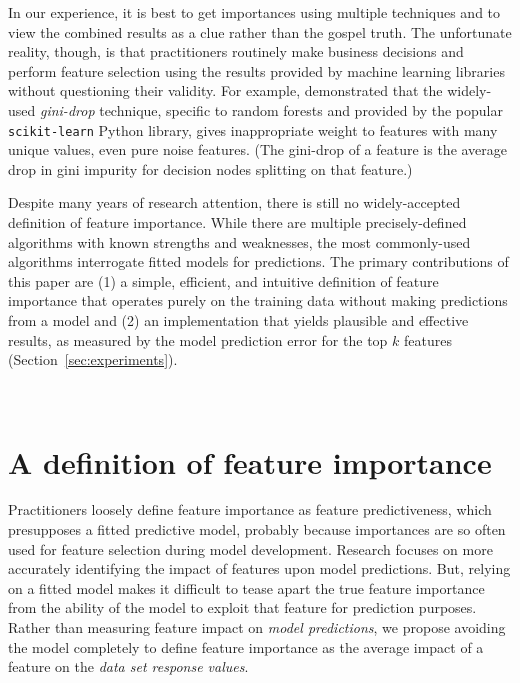 \documentclass[12pt]{article}
\newcommand{\secref}[1]{Section~\ref{#1}}
\newcommand{\todo}[1]{{{\color{red}{[#1]}}}}
\begin{document}
In our experience, it is best to get importances using multiple techniques and to view the combined results as a clue rather than the gospel truth.  The unfortunate reality, though, is that practitioners routinely make business decisions and  perform feature selection using the results provided by machine learning libraries without questioning their validity.  For example, \cite{rfpimp} demonstrated that the widely-used {\em gini-drop} technique, specific to random forests and provided by the popular {\tt scikit-learn} Python library, gives inappropriate weight to features with many unique values, even pure noise features. (The gini-drop of a feature is the average drop in gini impurity for decision nodes splitting on that feature.) \todo{transition}

Despite many years of research attention, there is still no widely-accepted definition of feature importance. While there are multiple precisely-defined algorithms with known strengths and weaknesses,  the most commonly-used algorithms interrogate fitted models for predictions. The primary contributions of this paper are (1) a simple, efficient, and intuitive definition of feature importance that operates purely on the training data without making predictions from a model and (2) an implementation that yields plausible and effective results, as measured by the model prediction error for the top $k$ features (\secref{sec:experiments}). \todo{probably need to say regression versus classifier here.}

~\\
\noindent \todo{Likely a good spot for a paper walk-through}

\section{A definition of feature importance}\label{sec:def}

Practitioners loosely define feature importance as feature predictiveness, which presupposes a fitted predictive model, probably because importances are so often used for feature selection during model development.  Research  focuses on more accurately identifying the impact of features upon model predictions.  But, relying on a fitted model makes it difficult to tease apart the true feature importance from the ability of the model to exploit that feature for prediction purposes. Rather than measuring feature impact on {\em model predictions}, we propose avoiding the model completely to define feature importance as the average impact of a feature on the {\em data set response values}.
\end{document}
